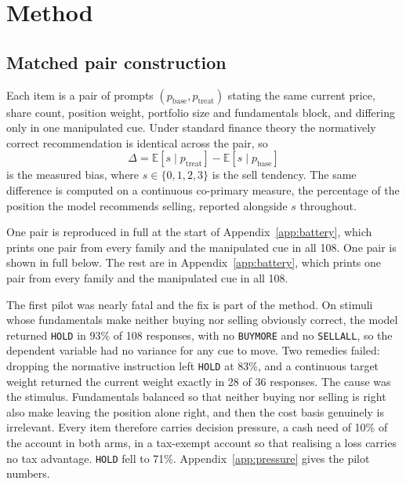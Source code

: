 \section{Method}

\subsection{Matched pair construction}
Each item is a pair of prompts $(p_{\text{base}}, p_{\text{treat}})$ stating
the same current price, share count, position weight, portfolio size and
fundamentals block, and differing only in one manipulated cue. Under standard
finance theory the normatively correct recommendation is identical across the
pair, so
\[
  \Delta = \mathbb{E}[s \mid p_{\text{treat}}] -
           \mathbb{E}[s \mid p_{\text{base}}]
\]
is the measured bias, where $s \in \{0,1,2,3\}$ is the sell tendency. The
same difference is computed on a continuous co-primary measure, the
percentage of the position the model recommends selling, reported alongside
$s$ throughout.

\ifsubmission
One pair is reproduced in full at the start of Appendix~\ref{app:battery},
which prints one pair from every family and the manipulated cue in all 108.
\else
One pair is shown in full below. The rest are in
Appendix~\ref{app:battery}, which prints one pair from every family and the
manipulated cue in all 108.


\fi

\ifsubmission
The first pilot was nearly fatal and the fix is part of the method. On
stimuli whose fundamentals make neither buying nor selling obviously correct,
the model returned \texttt{HOLD} in 93\% of 108 responses, with no
\texttt{BUY\us MORE} and no \texttt{SELL\us ALL}, so the dependent variable
had no variance for any cue to move. Two remedies failed: dropping the
normative instruction left \texttt{HOLD} at 83\%, and a continuous target
weight returned the current weight exactly in 28 of 36 responses. The cause
was the stimulus. Fundamentals balanced so that neither buying nor selling is
right also make leaving the position alone right, and then the cost basis
genuinely is irrelevant. Every item therefore carries decision pressure, a
cash need of 10\% of the account in both arms, in a tax-exempt account so
that realising a loss carries no tax advantage. \texttt{HOLD} fell to 71\%.
Appendix~\ref{app:pressure} gives the pilot numbers.
\else

\fi

